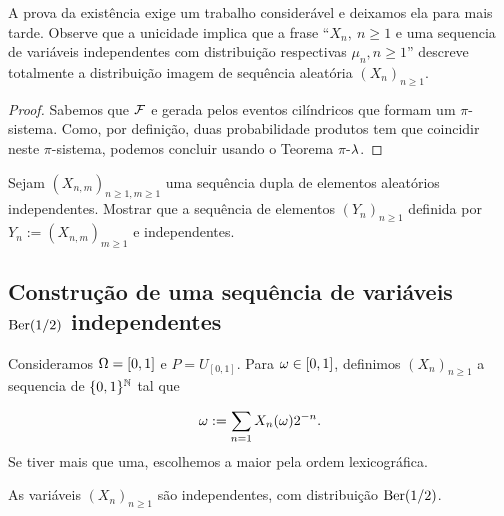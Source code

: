 \begin{topics}
A prova da existência exige um trabalho considerável e deixamos ela para mais tarde.
Observe que a unicidade implica que a frase ``$X_n, \ n\ge 1$ e uma sequencia de variáveis independentes com distribuição respectivas $\mu_n, n\ge 1$''
descreve totalmente a distribuição imagem de sequência aleatória $(X_n)_{n\ge 1}$.

\begin{proof}
 Sabemos que ${\mathcal F}$ e gerada pelos eventos cilíndricos que formam um $\pi$-sistema.
 Como, por definição, duas probabilidade produtos tem que coincidir neste $\pi$-sistema, podemos concluir usando
 o Teorema $\pi$-$\lambda$.
\end{proof}

\begin{exercise}\label{ex:duplo}
Sejam $(X_{n,m})_{n\ge 1,m\ge 1}$ uma sequência dupla de elementos aleatórios independentes.
Mostrar que a sequência de elementos $(Y_n)_{n\ge 1}$ definida por $Y_n:=(X_{n,m})_{m\ge 1}$ e independentes.
\end{exercise}

\end{topics}


\subsection{Construção de uma sequência de variáveis $\operatorname{Ber}(1/2)$ independentes}

 Consideramos $\Omega=[0,1]$ e $P=U_{[0,1]}$.
 Para $\omega\in[0,1]$, definimos $(X_n)_{n\ge 1}$ a sequencia de $\{0,1\}^{{\mathbb N}}$ tal que

 \begin{equation}\label{eq:deco}
 \omega:= \sum_{n=1} X_n(\omega)2^{-n}.
 \end{equation}
 Se tiver mais que uma, escolhemos a maior pela ordem lexicográfica.

 \begin{proposition}

 As variáveis $(X_n)_{n\ge 1}$ são independentes, com distribuição $\operatorname{Ber}(1/2)$.

 \end{proposition}


